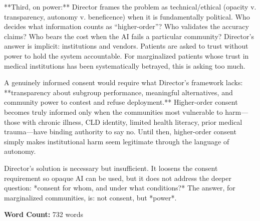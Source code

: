 \documentclass[12pt,twoside]{article}
\begin{document}
**Third, on power:** Director frames the problem as technical/ethical (opacity v. transparency, autonomy v. beneficence) when it is fundamentally political. Who decides what information counts as ``higher-order''? Who validates the accuracy claims? Who bears the cost when the AI fails a particular community? Director's answer is implicit: institutions and vendors. Patients are asked to trust without power to hold the system accountable. For marginalized patients whose trust in medical institutions has been systematically betrayed, this is asking too much.

A genuinely informed consent would require what Director's framework lacks: **transparency about subgroup performance, meaningful alternatives, and community power to contest and refuse deployment.** Higher-order consent becomes truly informed only when the communities most vulnerable to harm---those with chronic illness, CLD identity, limited health literacy, prior medical trauma---have binding authority to say no. Until then, higher-order consent simply makes institutional harm seem legitimate through the language of autonomy.

Director's solution is necessary but insufficient. It loosens the consent requirement so opaque AI can be used, but it does not address the deeper question: *consent for whom, and under what conditions?* The answer, for marginalized communities, is: not consent, but *power*.

\vfill
\noindent\centering\footnotesize\textbf{Word Count:} 732 words
\end{document}
